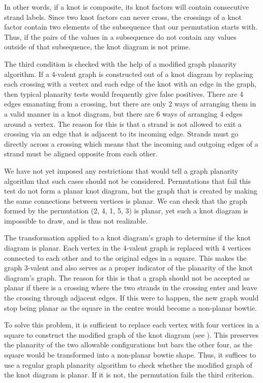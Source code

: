 \begin{paper}
In other words, if a knot is composite, its knot factors will contain
consecutive strand labels.
Since two knot factors can never cross, the crossings of a knot factor contain
two elements of the subsequence that our permutation starts with.
Thus, if the pairs of the values in a subsequence do not contain any values
outside of that subsequence, the knot diagram is not prime.

The third condition is checked with the help of a modified graph planarity
algorithm.
If a 4-valent graph is constructed out of a knot diagram by replacing each
crossing with a vertex and each edge of the knot with an edge in the graph, then
typical planarity tests would frequently give false positives.
There are 4 edges emanating from a crossing, but there are only 2 ways of
arranging them in a valid manner in a knot diagram, but there are 6 ways of
arranging 4 edges around a vertex.
The reason for this is that a strand is not allowed to exit a crossing via an
edge that is adjacent to its incoming edge.
Strands must go directly across a crossing which means that the incoming and
outgoing edges of a strand must be aligned opposite from each other.

We have not yet imposed any restrictions that would tell a graph planarity
algorithm that such cases should not be considered.
Permutations that fail this test do not form a planar knot diagram, but the
graph that is created by making the same connections between vertices is
planar.
We can check that the graph formed by the permutation (2, 4, 1, 5, 3) is planar,
yet such a knot diagram is impossible to draw, and is thus not realizable.

{The transformation applied to a knot diagram's graph to determine if the knot
diagram is planar.
Each vertex in the 4-valent graph is replaced with 4 vertices connected to each
other and to the original edges in a square.
This makes the graph 3-valent and also serves as a proper indicator of the
planarity of the knot diagram's graph.
The reason for this is that a graph should not be accepted as planar if there is
a crossing where the two strands in the crossing enter and leave the crossing
through adjacent edges.
If this were to happen, the new graph would stop being planar as the square in
the centre would become a non-planar bowtie.}

To solve this problem, it is sufficient to replace each vertex with four
vertices in a square to construct the modified graph of the knot diagram (see
\figGraph).
This preserves the planarity of the two allowable configurations but bars the
other four, as the square would be transformed into a non-planar bowtie shape.
Thus, it suffices to use a regular graph planarity algorithm to check whether
the modified graph of the knot diagram is planar.
If it is not, the permutation fails the third criterion.


\end{paper}
